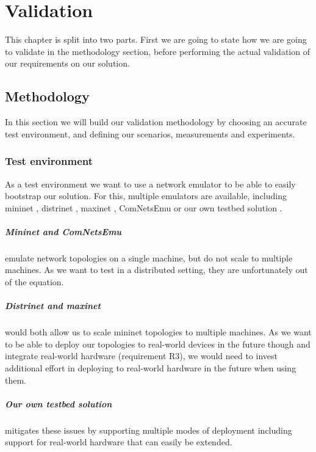 \chapter{Validation}
\label{validation}

This chapter is split into two parts. First we are going to state how we are going to validate in the methodology section, before performing the actual validation of our requirements on our solution.


\section{Methodology}
\label{validation_methodology}
In this section we will build our validation methodology by choosing an accurate test environment, and defining our scenarios, measurements and experiments.

\subsection{Test environment}
As a test environment we want to use a network emulator to be able to easily bootstrap our solution. For this, multiple emulators are available, including mininet \cite{mininet}, distrinet \cite{distrinet1, distrinet2}, maxinet \cite{maxinet}, ComNetsEmu \cite{comnetsemu} or our own testbed solution \cite{owntb}.

\paragraph{Mininet and ComNetsEmu} emulate network topologies on a single machine, but do not scale to multiple machines. As we want to test in a distributed setting, they are unfortunately out of the equation.

\paragraph{Distrinet and maxinet} would both allow us to scale mininet topologies to multiple machines. As we want to be able to deploy our topologies to real-world devices in the future though and integrate real-world hardware (requirement R3), we would need to invest additional effort in deploying to real-world hardware in the future when using them.

\paragraph{Our own testbed solution} mitigates these issues by supporting multiple modes of deployment including support for real-world hardware that can easily be extended.

